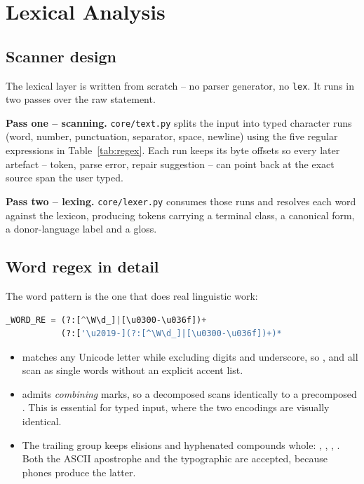 \section{Lexical Analysis}\label{sec:lexical}

\subsection{Scanner design}

The lexical layer is written from scratch -- no parser generator, no \texttt{lex}. It runs
in two passes over the raw statement.

\textbf{Pass one -- scanning.} \texttt{core/text.py} splits the input into typed character
runs (word, number, punctuation, separator, space, newline) using the five regular
expressions in Table~\ref{tab:regex}. Each run keeps its byte offsets so every later
artefact -- token, parse error, repair suggestion -- can point back at the exact source
span the user typed.

\textbf{Pass two -- lexing.} \texttt{core/lexer.py} consumes those runs and resolves each
word against the lexicon, producing tokens carrying a terminal class, a canonical form, a
donor-language label and a gloss.



\subsection{Word regex in detail}

The word pattern is the one that does real linguistic work:

\begin{lstlisting}[language=Python, numbers=none, basicstyle=\ttfamily\footnotesize]
_WORD_RE = (?:[^\W\d_]|[\u0300-\u036f])+
           (?:['\u2019-](?:[^\W\d_]|[\u0300-\u036f])+)*
\end{lstlisting}

\begin{itemize}[leftmargin=1.4em, itemsep=0.2em]
  \item {} matches any Unicode letter while
        excluding digits and underscore, so ,  and  all scan as
        single words without an explicit accent list.
  \item {} admits \emph{combining} marks,
        so a decomposed  scans identically to a precomposed . This is
        essential for typed input, where the two encodings are visually identical.
  \item The trailing group keeps elisions and hyphenated compounds whole:
        , , , . Both the ASCII apostrophe and
        the typographic  are accepted, because phones produce the latter.
\end{itemize}

